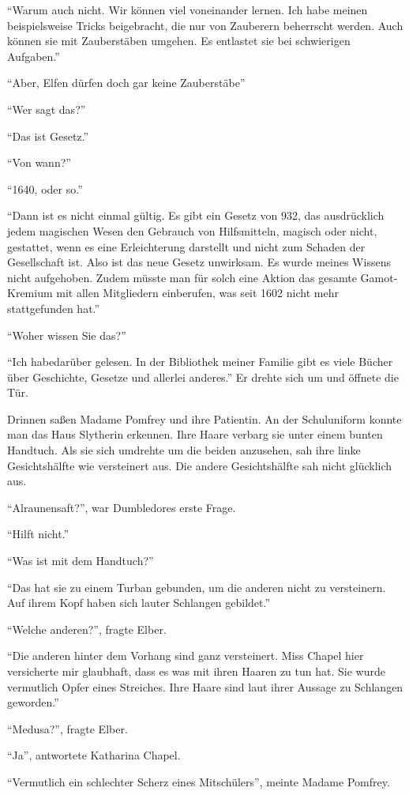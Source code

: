 \enquote{Warum auch nicht. Wir können viel voneinander lernen. Ich habe meinen beispielsweise Tricks beigebracht, die nur von Zauberern beherrscht werden. Auch können sie mit Zauberstäben umgehen. Es entlastet sie bei schwierigen Aufgaben.}

\enquote{Aber, Elfen dürfen doch gar keine Zauberstäbe\abs}

\enquote{Wer sagt das?}

\enquote{Das ist Gesetz.}

\enquote{Von wann?}

\enquote{1640, oder so.}

\enquote{Dann ist es nicht einmal gültig. Es gibt ein Gesetz von 932, das ausdrücklich jedem magischen Wesen den Gebrauch von Hilfsmitteln, magisch oder nicht, gestattet, wenn es eine Erleichterung darstellt und nicht zum Schaden der Gesellschaft ist. Also ist das neue Gesetz unwirksam. Es wurde meines Wissens nicht aufgehoben. Zudem müsste man für solch eine Aktion das gesamte Gamot-Kremium mit allen Mitgliedern einberufen, was seit 1602 nicht mehr stattgefunden hat.}

\enquote{Woher wissen Sie das?}

\enquote{Ich habe\abs darüber gelesen. In der Bibliothek meiner Familie gibt es viele Bücher über Geschichte, Gesetze und allerlei anderes.} Er drehte sich um und öffnete die Tür.

Drinnen saßen Madame Pomfrey und ihre Patientin. An der Schuluniform konnte man das Haus Slytherin erkennen. Ihre Haare verbarg sie unter einem bunten Handtuch. Als sie sich umdrehte um die beiden anzusehen, sah ihre linke Gesichtshälfte wie versteinert aus. Die andere Gesichtshälfte sah nicht glücklich aus.

\enquote{Alraunensaft?}, war Dumbledores erste Frage.

\enquote{Hilft nicht.}

\enquote{Was ist mit dem Handtuch?}

\enquote{Das hat sie zu einem Turban gebunden, um die anderen nicht zu versteinern. Auf ihrem Kopf haben sich lauter Schlangen gebildet.}

\enquote{Welche anderen?}, fragte Elber.

\enquote{Die anderen hinter dem Vorhang sind ganz versteinert. Miss Chapel hier versicherte mir glaubhaft, dass es was mit ihren Haaren zu tun hat. Sie wurde vermutlich Opfer eines Streiches. Ihre Haare sind laut ihrer Aussage zu Schlangen geworden.}

\enquote{Medusa?}, fragte Elber.

\enquote{Ja}, antwortete Katharina Chapel.

\enquote{Vermutlich ein schlechter Scherz eines Mitschülers}, meinte Madame Pomfrey.
